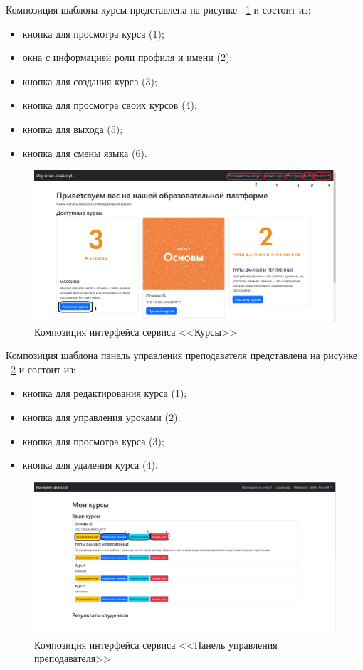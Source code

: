 Композиция шаблона курсы представлена на рисунке ~\ref{templ:image1} и состоит из:

\begin{itemize}
	\item кнопка для просмотра курса (1);
	\item окна с информацией роли профиля и имени (2);
	\item кнопка для создания курса (3);
	\item кнопка для просмотра своих курсов (4);
	\item кнопка для выхода (5);
	\item кнопка для смены языка (6).
\end{itemize}

\begin{figure}[h]
	\centering
	\includegraphics[width=1\linewidth]{images/курсы}
	\caption{Композиция интерфейса сервиса <<Курсы>>}
	\label{templ:image1}
\end{figure}

Композиция шаблона панель управления преподавателя представлена на рисунке ~\ref{templ:image2} и состоит из:

\begin{itemize}
	\item кнопка для редактирования курса (1);
	\item кнопка для управления уроками (2);
	\item кнопка для просмотра курса (3);
	\item кнопка для удаления курса (4).
\end{itemize}

\begin{figure}[h]
	\centering
	\includegraphics[width=1\linewidth]{images/учитель}
	\caption{Композиция интерфейса сервиса <<Панель управления преподавателя>>}
	\label{templ:image2}
\end{figure}
\newpage 

